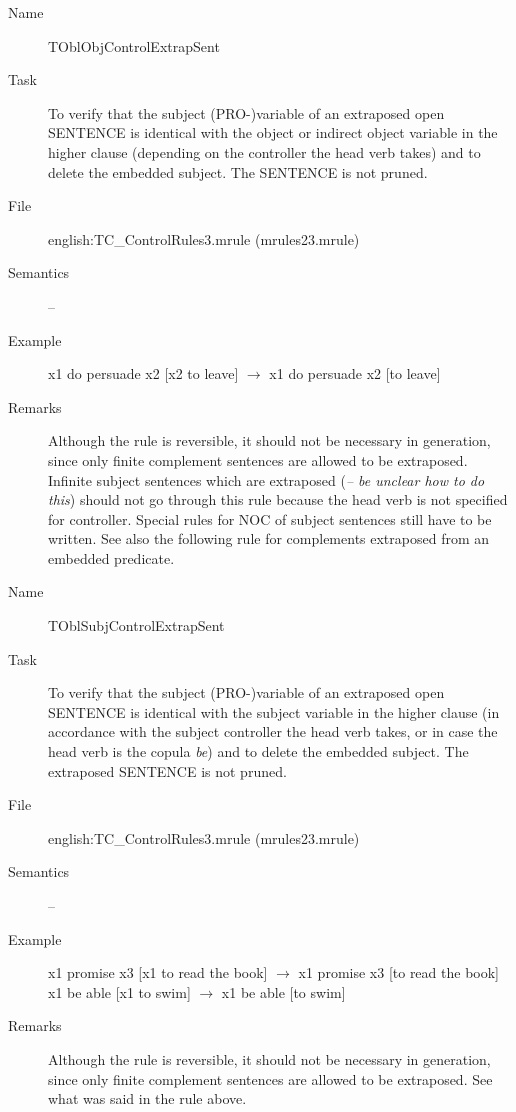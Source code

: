 \begin{description}
\vspace{1 cm}
\begin{description}
\item[Name]   TOblObjControlExtrapSent
\item[Task] To verify that  the subject (PRO-)variable of an extraposed
open SENTENCE is identical with the object or indirect object variable in the 
higher clause (depending on the controller the head verb takes)
and to delete the embedded subject. The SENTENCE is not pruned.
\item[File] english:TC\_ControlRules3.mrule (mrules23.mrule)
\item[Semantics] --
\item[Example] x1 do persuade x2 [x2 to leave] $\rightarrow$ x1 do persuade x2 
[to leave]
\item[Remarks] Although the rule is reversible, it should not be necessary in 
generation, since only finite complement sentences are allowed to be 
extraposed. Infinite subject sentences which are extraposed ({\em -- be unclear 
how to do this\/}) should not go through this rule because the head verb is not 
specified for controller. Special rules for NOC of subject sentences still have 
to be written. See also the following rule for complements extraposed from an 
embedded predicate.
\end{description}

\vspace{1 cm}
\begin{description}
\item[Name] TOblSubjControlExtrapSent
\item[Task] To verify that  the subject (PRO-)variable of an extraposed
open SENTENCE is 
identical with the subject variable in the higher clause (in accordance with 
the subject controller the head verb takes, or in case the head verb is the 
copula {\em be\/})
and to delete the embedded subject. The extraposed SENTENCE is not pruned.
\item[File] english:TC\_ControlRules3.mrule (mrules23.mrule)
\item[Semantics] --
\item[Example] x1 promise x3 [x1 to read the book] $\rightarrow$ x1 promise x3 
[to read the book] \\
x1 be able [x1 to swim] $\rightarrow$ x1 be able [to swim]
\item[Remarks] Although the rule is reversible, it should not be necessary in 
generation, since only finite complement sentences are allowed to be 
extraposed. See what was said in the rule above.
\end{description}


\end{description}
